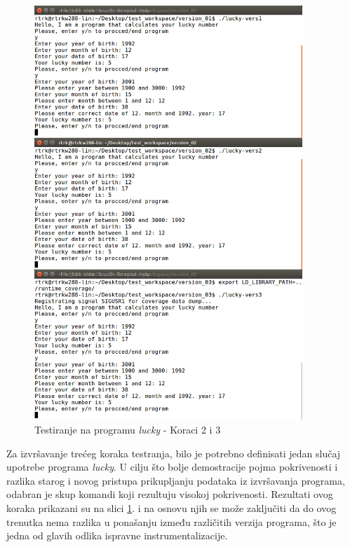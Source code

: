 \documentclass[12pt,oneside]{memoir}
\newcommand{\strano}[1]{\textit{#1}}
\begin{document}
\begin{figure}[!ht]
  \centering
  \includegraphics[width=0.9\textwidth]{img/lucky2-ng.png}
  \caption{Testiranje na programu \strano{lucky} - Koraci 2 i 3}
  \label{fig:lucky-test-2}
\end{figure}

Za izvršavanje trećeg koraka testranja, bilo je potrebno definisati jedan slučaj upotrebe programa \strano{lucky}. U cilju što bolje demostracije pojma pokrivenosti i razlika starog i novog pristupa prikupljanju podataka iz izvršavanja programa, odabran je skup komandi koji rezultuju visokoj pokrivenosti. Rezultati ovog koraka prikazani su na slici \ref{fig:lucky-test-2}. i na osnovu njih se može zaključiti da do ovog trenutka nema razlika u ponašanju između različitih verzija programa, što je jedna od glavih odlika ispravne instrumentalizacije. 
\end{document}
